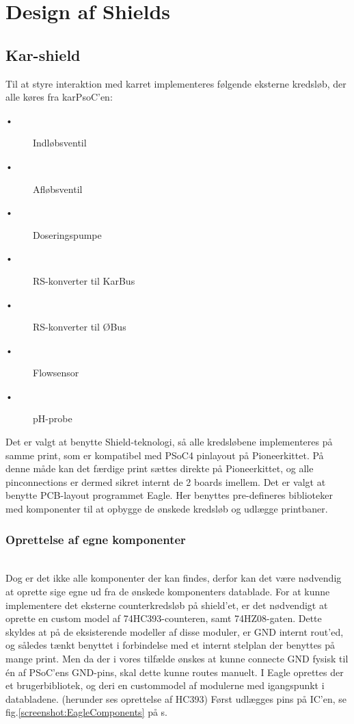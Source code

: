 
\section{Design af Shields}
\subsection{Kar-shield}

Til at styre interaktion med karret implementeres følgende eksterne kredsløb, der alle køres fra karPsoC'en: 

\begin{description}
 \item[•] Indløbsventil
 \item[•] Afløbsventil
 \item[•] Doseringspumpe
 \item[•] RS-konverter til KarBus
 \item[•] RS-konverter til ØBus
 \item[•] Flowsensor
 \item[•] pH-probe
\end{description}
 
Det er valgt at benytte Shield-teknologi, så alle kredsløbene implementeres på samme print, som er kompatibel med PSoC4 pinlayout på Pioneerkittet. På denne måde kan det færdige print sættes direkte på Pioneerkittet, og alle pinconnections er dermed sikret internt de 2 boards imellem. 
Det er valgt at benytte PCB-layout programmet Eagle. Her benyttes pre-defineres biblioteker med komponenter til at opbygge de ønskede kredsløb og udlægge printbaner.  

\subsubsection{Oprettelse af egne komponenter} \hspace{0pt} \\
Dog er det ikke alle komponenter der kan findes, derfor kan det være nødvendig at oprette sige egne ud fra de ønskede komponenters datablade. 
For at kunne implementere det eksterne counterkredsløb på shield'et, er det nødvendigt at oprette en custom model af 74HC393-counteren, samt 74HZ08-gaten.
Dette skyldes at på de eksisterende modeller af disse moduler, er GND internt rout'ed, og således tænkt benyttet i forbindelse med et internt stelplan der benyttes på mange print. Men da der i vores tilfælde ønskes at kunne connecte GND fysisk til én af PSoC'ens GND-pins, skal dette kunne routes manuelt.
I Eagle oprettes der et brugerbibliotek, og deri en custommodel af modulerne med igangspunkt i databladene. (herunder ses oprettelse af HC393)
Først udlægges pins på IC'en, se fig.\ref{screenshot:EagleComponents} på s.\pageref{screenshot:EagleComponents}

